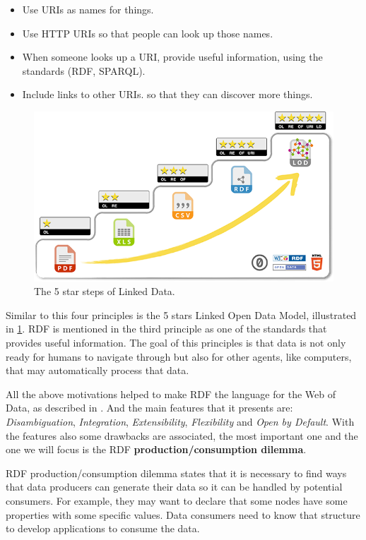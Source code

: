 \begin{itemize}
  \item Use URIs as names for things.
  \item Use HTTP URIs so that people can look up those names.
  \item When someone looks up a URI, provide useful information, using the standards (RDF, SPARQL).
  \item Include links to other URIs. so that they can discover more things.
\end{itemize}

\begin{figure}
    \includegraphics[scale=0.5]{images/5-star-steps.png}
    \centering
	\caption[The 5 star steps of Linked Data]{The 5 star steps of Linked Data.}
	\label{fig:margin-5-star-steps}
\end{figure}

Similar to this four principles is the 5 stars Linked Open Data Model, illustrated in \cref{fig:margin-5-star-steps}.
RDF is mentioned in the third principle as one of the standards that provides useful information. The goal of this
principles is that data is not only ready for humans to navigate through but also for other agents, like computers,
that may automatically process that data.

All the above motivations helped to make RDF the language for the Web of Data, as described in \cite{labra-validating-rdf}.
And the main features that it presents are: \textit{Disambiguation}, \textit{Integration}, \textit{Extensibility}, \textit{Flexibility} and \textit{Open by Default}.
With the features also some drawbacks are associated, the most important one and the one we will focus is the RDF
\textbf{production/consumption dilemma}.

RDF production/consumption dilemma states that it is necessary to find ways that data producers can generate their data so
it can be handled by potential consumers. For example, they may want to declare that some nodes have some properties with
some specific values. Data consumers need to know that structure to develop applications to consume the data.

